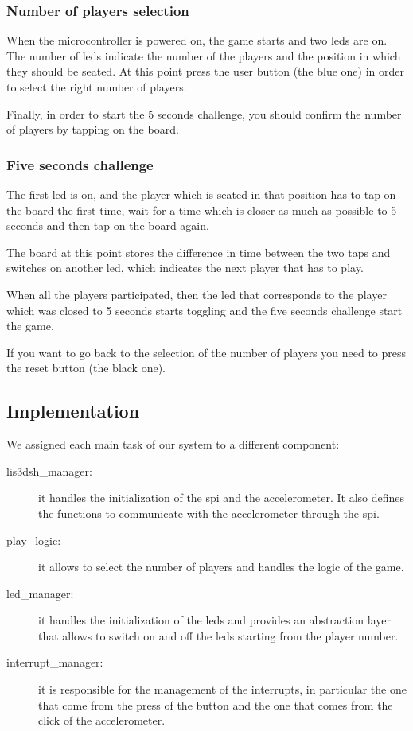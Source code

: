 \subsubsection{Number of players selection}
When the microcontroller is powered on, the game starts and two leds are on.
The number of leds indicate the number of the players and the position in which
they should be seated.
At this point press the user button (the blue one) in order to select the right
number of players.

Finally, in order to start the 5 seconds challenge, you should confirm the number of players by tapping on the board.

\subsubsection{Five seconds challenge}
The first led is on, and the player which is seated in that position has to
tap on the board the first time, wait for a time which is closer as much as
possible to 5 seconds and then tap on the board again.

The board at this point stores the difference in time between the two taps and
switches on another led, which indicates the next player that has to play.

When all the players participated, then the led that corresponds to the player
which was closed to 5 seconds starts toggling and the five seconds challenge start
the game.

If you want to go back to the selection of the number of players you need to
press the reset button (the black one).

\subsection{Implementation}
We assigned each main task of our system to a different component:

\begin{description}
  \item [lis3dsh\_manager:] it handles the initialization of the spi and the
    accelerometer. It also defines the functions to communicate with the accelerometer through
    the spi.
  \item [play\_logic:] it allows to select the number of players and handles the logic of the game.
  \item [led\_manager:] it handles the initialization of the leds and provides an
    abstraction layer that allows to switch on and off the leds starting from
    the player number.
  \item [interrupt\_manager:] it is responsible for the management of the
    interrupts, in particular the one that come from the press of the button and
    the one that comes from the click of the accelerometer.
\end{description}


